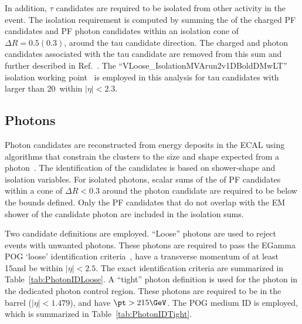In addition, $\tau$ candidates are required to be isolated from other activity in the
event. The isolation requirement is computed by summing the \pt of the charged PF
candidates and PF photon candidates within an isolation cone of $\Delta R = 0.5 (0.3)$,
around the tau candidate direction. The charged and photon candidates associated with the
tau candidate are removed from this sum and further described in Ref.~\cite{Khachatryan:2015dfa}.
The ``VLoose\_IsolationMVArun2v1DBoldDMwLT'' isolation working point~\cite{taupog_twiki} is employed in this analysis
for tau candidates with \pt larger than 20~\GeV within $|\eta| < 2.3$.


\subsection{Photons}

Photon candidates are reconstructed from energy deposits in the ECAL using algorithms
that constrain the clusters to the size and shape expected from a photon~\cite{CMS:EGM-14-001}.
The identification of the candidates is based on shower-shape and isolation variables.
For isolated photons, scalar sums of the \pt of PF candidates within a cone of $\Delta R < 0.3$
around the photon candidate are required to be below the bounds defined. Only the PF candidates
that do not overlap with the EM shower of the candidate photon are included in the isolation sums.

Two candidate definitions are employed. ``Loose'' photons are used to reject events with unwanted
photons. These photons are required to pass the EGamma POG `loose' identification criteria~\cite{CMS-EGM-TWIKI-GAMID},
have a transverse momentum of at least 15\GeV and be within $|\eta|<2.5$. The exact identification criteria are summarized in Table~\ref{tab:PhotonIDLoose}.
A ``tight'' photon definition is used for the photon in the dedicated photon control region. These photons are required to be in the barrel ($|\eta|<1.479$), and have $\pt>215\GeV$. The POG medium ID is employed, which is summarized in Table~\ref{tab:PhotonIDTight}.

